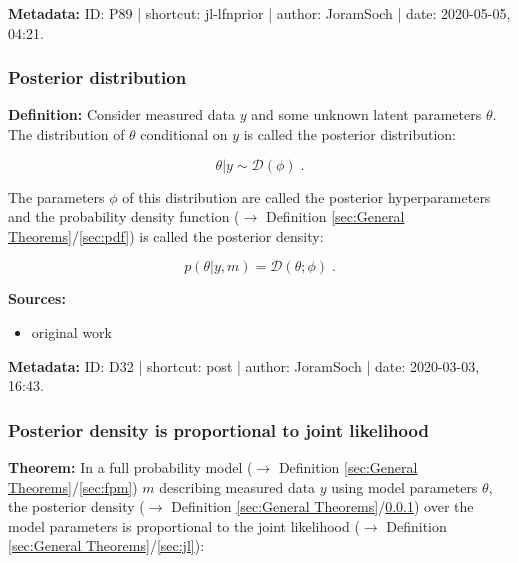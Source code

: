 \documentclass[a4paper,12pt,twoside]{book}
\begin{document}
\vspace{1em}
\textbf{Metadata:} ID: P89 | shortcut: jl-lfnprior | author: JoramSoch | date: 2020-05-05, 04:21.
\vspace{1em}



\subsubsection[\textit{Posterior distribution}]{Posterior distribution} \label{sec:post}
\setcounter{equation}{0}

\textbf{Definition:} Consider measured data $y$ and some unknown latent parameters $\theta$. The distribution of $\theta$ conditional on $y$ is called the posterior distribution:

\begin{equation} \label{eq:post-post}
\theta|y \sim \mathcal{D}(\phi) \; .
\end{equation}

The parameters $\phi$ of this distribution are called the posterior hyperparameters and the probability density function ($\rightarrow$ Definition \ref{sec:General Theorems}/\ref{sec:pdf}) is called the posterior density:

\begin{equation} \label{eq:post-prior-pdf}
p(\theta|y,m) = \mathcal{D}(\theta; \phi) \; .
\end{equation}


\vspace{1em}
\textbf{Sources:}
\begin{itemize}
\item original work\end{itemize}


\vspace{1em}
\textbf{Metadata:} ID: D32 | shortcut: post | author: JoramSoch | date: 2020-03-03, 16:43.
\vspace{1em}



\subsubsection[\textbf{Posterior density is proportional to joint likelihood}]{Posterior density is proportional to joint likelihood} \label{sec:post-jl}
\setcounter{equation}{0}

\textbf{Theorem:} In a full probability model ($\rightarrow$ Definition \ref{sec:General Theorems}/\ref{sec:fpm}) $m$ describing measured data $y$ using model parameters $\theta$, the posterior density ($\rightarrow$ Definition \ref{sec:General Theorems}/\ref{sec:post}) over the model parameters is proportional to the joint likelihood ($\rightarrow$ Definition \ref{sec:General Theorems}/\ref{sec:jl}):
\end{document}
